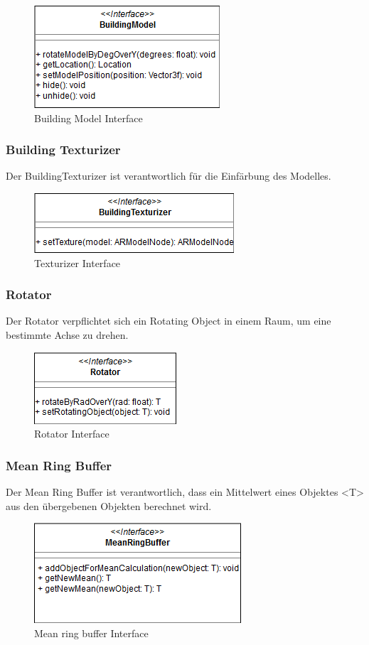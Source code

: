 \documentclass[a4paper]{scrreprt}
\begin{document}
\begin{figure}[h!]
	\center
	\includegraphics[scale=0.6]{BuildingModel.png}
	\caption{Building Model Interface}
\end{figure}

\subsubsection{Building Texturizer}
Der BuildingTexturizer ist verantwortlich für die Einfärbung des Modelles.
\begin{figure}[h!]
	\center
	\includegraphics[scale=0.6]{BuildingTexturizer.png}
	\caption{Texturizer Interface}
\end{figure}


\subsubsection{Rotator}
Der Rotator verpflichtet sich ein Rotating Object in einem Raum, um eine bestimmte Achse zu drehen.
\begin{figure}[h!]
	\center
	\includegraphics[scale=0.6]{Rotator.png}
	\caption{Rotator Interface}
\end{figure}


\subsubsection{Mean Ring Buffer}
Der Mean Ring Buffer ist verantwortlich, dass ein Mittelwert eines Objektes <T> aus den übergebenen Objekten berechnet wird.
\begin{figure}[h!]
	\center
	\includegraphics[scale=0.6]{MeanRingBuffer.png}
	\caption{Mean ring buffer Interface}
\end{figure}
\end{document}
